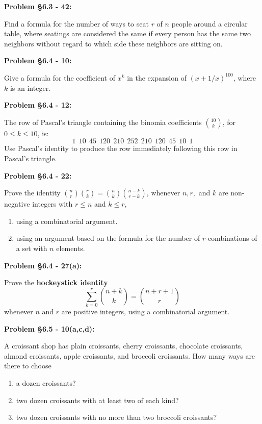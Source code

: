 \documentclass{article}
\newenvironment{problem}[1]
    {\begin{mdframed}[default]
    \textbf{Problem #1:}
    }
    {\end{mdframed}
    }
\begin{document}
\begin{problem}{\S 6.3 - 42}
Find a formula for the number of ways to seat $r$ of $n$ people around a circular table, where seatings are considered the same if every person has the same two neighbors without regard to which side these neighbors are sitting on.
\end{problem}

\begin{problem}{\S 6.4 - 10}
Give a formula for the coefficient of $x^k$ in the expansion of $(x+1/x)^{100}$, where $k$ is an integer.
\end{problem}

\begin{problem}{\S 6.4 - 12}
The row of Pascal's triangle containing the binomia coefficients ${ 10 \choose k}$, for $0 \leq k \leq 10$, is:
\[1~~10~~45~~120~~210~~252~~210~~120~~45~~10~~1 \]
Use Pascal's identity to produce the row immediately following this row in Pascal's triangle.
\end{problem}

\begin{problem}{\S 6.4 - 22}
Prove the identity ${n \choose r}{r \choose k} = {n \choose k}{n-k \choose r-k}$, whenever $n, r,$ and $k$ are non-negative integers with $r \leq n$ and $k \leq r$,
\begin{enumerate}
    \item[(a)] using a combinatorial argument.
    \item[(b)] using an argument based on the formula for the number of $r$-combinations of a set with $n$ elements.
\end{enumerate}
\end{problem}

\begin{problem}{\S 6.4 - 27(a)}
Prove the \textbf{hockeystick identity}
\[ \sum_{k=0}^r {n+k \choose k} = {n + r + 1 \choose r } \]
whenever $n$ and $r$ are positive integers, using a combinatorial argument.
\end{problem}

\begin{problem}{\S 6.5 - 10(a,c,d)}
A croissant shop has plain croissants, cherry croissants, chocolate croissants, almond croissants, apple croissants, and broccoli croissants. How many ways are there to choose
\begin{enumerate}
    \item[(a)] a dozen croissants?
    \item[(c)] two dozen croissants with at least two of each kind?
    \item[(d)] two dozen croissants with no more than two broccoli croissants?
\end{enumerate}
\end{problem}
\end{document}
